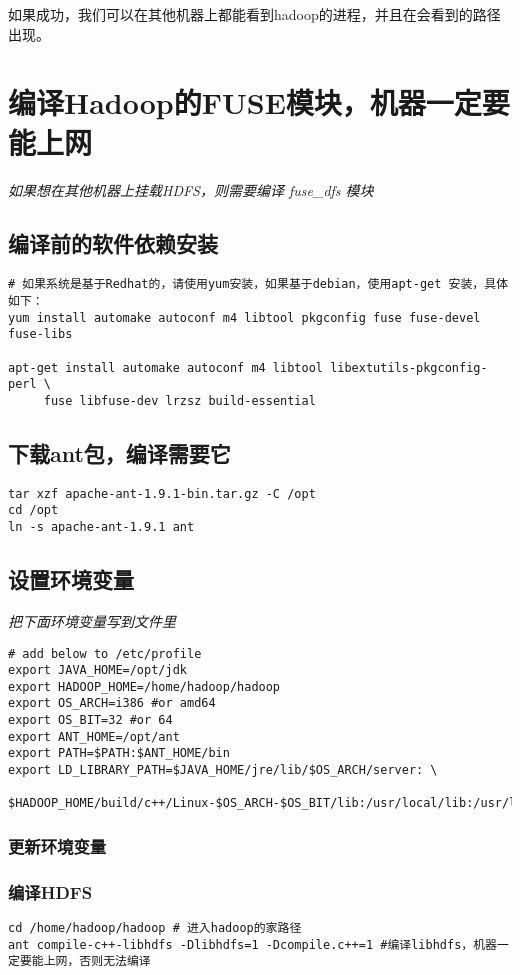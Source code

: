 \documentclass{article}
\begin{document}
如果成功，我们可以在其他机器上都能看到hadoop的进程，并且在会看到的路径
出现。

\section{编译Hadoop的FUSE模块，机器一定要能上网}
\textit{如果想在其他机器上挂载HDFS，则需要编译 fuse\_dfs 模块}
\subsection{编译前的软件依赖安装}
\begin{verbatim}
# 如果系统是基于Redhat的，请使用yum安装，如果基于debian，使用apt-get 安装，具体如下：
yum install automake autoconf m4 libtool pkgconfig fuse fuse-devel fuse-libs

apt-get install automake autoconf m4 libtool libextutils-pkgconfig-perl \
	 fuse libfuse-dev lrzsz build-essential
\end{verbatim}

\subsection{下载ant包，编译需要它}
\begin{verbatim}
tar xzf apache-ant-1.9.1-bin.tar.gz -C /opt
cd /opt
ln -s apache-ant-1.9.1 ant

\end{verbatim}

\subsection{设置环境变量}
\textit{把下面环境变量写到文件里}
\begin{verbatim}
# add below to /etc/profile
export JAVA_HOME=/opt/jdk
export HADOOP_HOME=/home/hadoop/hadoop
export OS_ARCH=i386 #or amd64
export OS_BIT=32 #or 64
export ANT_HOME=/opt/ant
export PATH=$PATH:$ANT_HOME/bin
export LD_LIBRARY_PATH=$JAVA_HOME/jre/lib/$OS_ARCH/server: \
	$HADOOP_HOME/build/c++/Linux-$OS_ARCH-$OS_BIT/lib:/usr/local/lib:/usr/lib
\end{verbatim}

\subsubsection{更新环境变量}

\subsubsection{编译HDFS}
\begin{verbatim}
cd /home/hadoop/hadoop # 进入hadoop的家路径
ant compile-c++-libhdfs -Dlibhdfs=1 -Dcompile.c++=1 #编译libhdfs，机器一定要能上网，否则无法编译
\end{verbatim}
\end{document}
